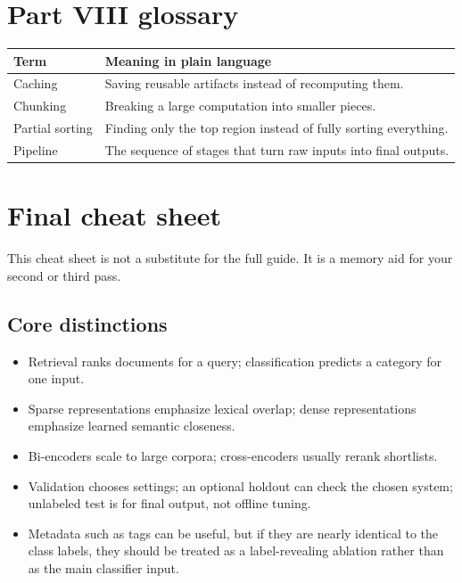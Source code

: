 \documentclass[11pt,oneside]{report}
\begin{document}
\chapter*{Part VIII glossary}
\begin{longtable}{p{}p{}}
\toprule
\textbf{Term} & \textbf{Meaning in plain language} \\ \midrule
Caching & Saving reusable artifacts instead of recomputing them. \\ \midrule
Chunking & Breaking a large computation into smaller pieces. \\ \midrule
Partial sorting & Finding only the top region instead of fully sorting everything. \\ \midrule
Pipeline & The sequence of stages that turn raw inputs into final outputs. \\
\bottomrule
\end{longtable}


\appendix
\chapter{Final cheat sheet}
\begin{purposebox}
This cheat sheet is not a substitute for the full guide. It is a memory aid for your second or third pass.
\end{purposebox}

\section*{Core distinctions}
\begin{itemize}
\item Retrieval ranks documents for a query; classification predicts a category for one input.
\item Sparse representations emphasize lexical overlap; dense representations emphasize learned semantic closeness.
\item Bi-encoders scale to large corpora; cross-encoders usually rerank shortlists.
\item Validation chooses settings; an optional holdout can check the chosen system; unlabeled test is for final output, not offline tuning.
\item Metadata such as tags can be useful, but if they are nearly identical to the class labels, they should be treated as a label-revealing ablation rather than as the main classifier input.
\end{itemize}
\end{document}
